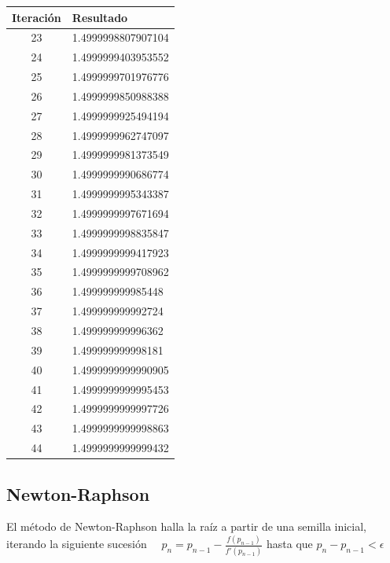 \documentclass[titlepage,a4paper]{article}
\begin{document}
\begin{multicols}{2}
\begin{center}
\begin{tabular}{| c | l |}
           \hline
    \end{tabular}
\end{center}
        \begin{center}
    \begin{tabular}{| c | l |}
    \hline
     Iteración & Resultado \\ \hline
23     &  1.4999998807907104 \\
24     &  1.4999999403953552 \\
25     &  1.4999999701976776 \\
26     &  1.4999999850988388 \\
27     &  1.4999999925494194 \\
28     &  1.4999999962747097 \\
29     &  1.4999999981373549 \\
30     &  1.4999999990686774 \\
31     &  1.4999999995343387 \\
32     &  1.4999999997671694 \\
33     &  1.4999999998835847 \\
34     &  1.4999999999417923 \\
35     &  1.4999999999708962 \\
36     &  1.499999999985448 \\
37     &  1.499999999992724 \\
38     &  1.499999999996362 \\
39     &  1.499999999998181 \\
40     &  1.4999999999990905 \\
41     &  1.4999999999995453 \\
42     &  1.4999999999997726 \\
43     &  1.4999999999998863 \\
44     &  1.4999999999999432 \\
    \hline
    \end{tabular}
\end{center}
\end{multicols}

\subsection{Newton-Raphson}\label{sec:NewtonRaphson}
El método de Newton-Raphson halla la raíz a partir de una semilla inicial, iterando la siguiente sucesión
$\quad p_{n} =p_{n-1}-\frac{f (p_{n-1})}{f'(p_{n-1})}$ hasta que 
$p_{n}-p_{n-1} < \mbox{$\epsilon$}$
\end{document}
